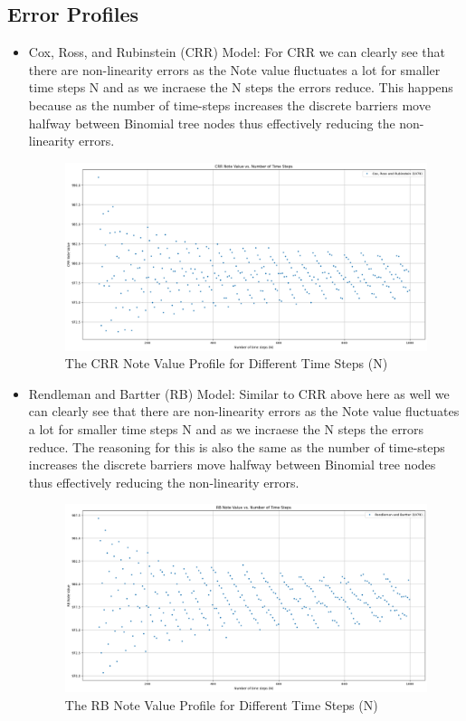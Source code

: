 \documentclass[12pt,a4paper]{article}
\begin{document}
\subsection*{Error Profiles}
\begin{itemize}
\item Cox, Ross, and Rubinstein (CRR) Model:
For CRR we can clearly see that there are non-linearity errors as the Note value fluctuates a lot for smaller time steps N and as we incraese the N steps the errors reduce. This happens because as the number of time-steps increases the discrete barriers move halfway between Binomial tree nodes thus effectively reducing the non-linearity errors.
\begin{figure}[H]
    \centering
    \includegraphics[width=1.1\textwidth, height=0.23\textheight]{Images/err_crr.png}
    \caption{The CRR Note Value Profile for Different Time Steps (N)}
    \label{fig:yourlabel}
\end{figure}


\item  Rendleman and Bartter (RB) Model:
Similar to CRR above here as well we can clearly see that there are non-linearity errors as the Note value fluctuates a lot for smaller time steps N and as we incraese the N steps the errors reduce. The reasoning for this is also the same  as the number of time-steps increases the discrete barriers move halfway between Binomial tree nodes thus effectively reducing the non-linearity errors.
\begin{figure}[H]
    \centering
    \includegraphics[width=1.1\textwidth, height=0.23\textheight]{Images/err_rb.png}
    \caption{The RB Note Value Profile for Different Time Steps (N)}
    \label{fig:yourlabel}
\end{figure}



\end{itemize}
\end{document}
